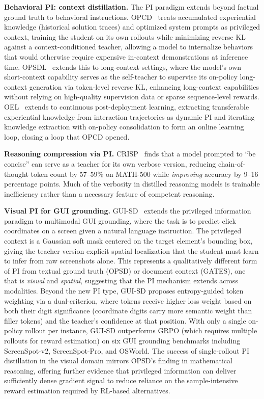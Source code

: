 \documentclass{article} %
\begin{document}
\textbf{Behavioral PI: context distillation.} The PI paradigm extends beyond factual ground truth to behavioral instructions. OPCD~\citep{2602.12275} treats accumulated experiential knowledge (historical solution traces) and optimized system prompts as privileged context, training the student on its own rollouts while minimizing reverse KL against a context-conditioned teacher, allowing a model to internalize behaviors that would otherwise require expensive in-context demonstrations at inference time. OPSDL~\citep{2604.17535} extends this to long-context settings, where the model's own short-context capability serves as the self-teacher to supervise its on-policy long-context generation via token-level reverse KL, enhancing long-context capabilities without relying on high-quality supervision data or sparse sequence-level rewards. OEL~\citep{2603.16856} extends to continuous post-deployment learning, extracting transferable experiential knowledge from interaction trajectories as dynamic PI and iterating knowledge extraction with on-policy consolidation to form an online learning loop, closing a loop that OPCD opened.

\textbf{Reasoning compression via PI.} CRISP~\citep{2603.05433} finds that a model prompted to ``be concise'' can serve as a teacher for its own verbose version, reducing chain-of-thought token count by 57--59\% on MATH-500 while \emph{improving} accuracy by 9--16 percentage points. Much of the verbosity in distilled reasoning models is trainable inefficiency rather than a necessary feature of competent reasoning.

\textbf{Visual PI for GUI grounding.} GUI-SD~\citep{zhang2026guisd} extends the privileged information paradigm to multimodal GUI grounding, where the task is to predict click coordinates on a screen given a natural language instruction. The privileged context is a Gaussian soft mask centered on the target element's bounding box, giving the teacher version explicit spatial localization that the student must learn to infer from raw screenshots alone. This represents a qualitatively different form of PI from textual ground truth (OPSD) or document context (GATES), one that is \emph{visual} and \emph{spatial}, suggesting that the PI mechanism extends across modalities. Beyond the new PI type, GUI-SD proposes entropy-guided token weighting via a dual-criterion, where tokens receive higher loss weight based on both their digit significance (coordinate digits carry more semantic weight than filler tokens) and the teacher's confidence at that position. With only a single on-policy rollout per instance, GUI-SD outperforms GRPO (which requires multiple rollouts for reward estimation) on six GUI grounding benchmarks including ScreenSpot-v2, ScreenSpot-Pro, and OSWorld. The success of single-rollout PI distillation in the visual domain mirrors OPSD's finding in mathematical reasoning, offering further evidence that privileged information can deliver sufficiently dense gradient signal to reduce reliance on the sample-intensive reward estimation required by RL-based alternatives.
\end{document}
